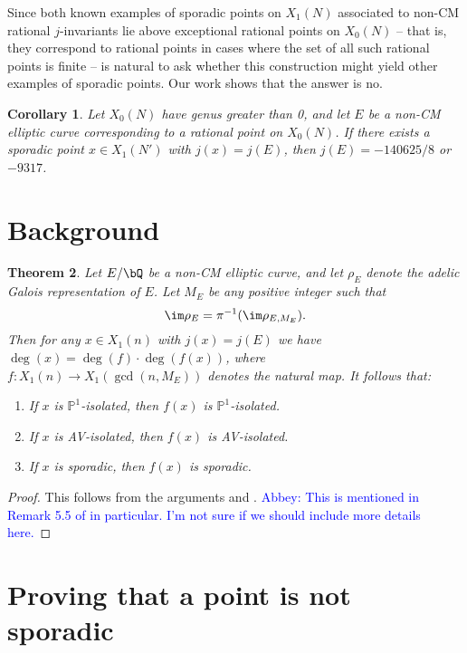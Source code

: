 \documentclass[11pt,reqno]{amsart}
\theoremstyle{plain}
\newtheorem{theorem}{Theorem}%
\newtheorem{corollary}[theorem]{Corollary}
\theoremstyle{definition}
\newcommand{\Q}{\bQ}
\newcommand{\abbey}[1]{\textcolor{blue}{Abbey: #1}}
\begin{document}
Since both known examples of sporadic points on $X_1(N)$ associated to non-CM rational $j$-invariants lie above exceptional rational points on $X_0(N)$ -- that is, they correspond to rational points in cases where the set of all such rational points is finite -- is natural to ask whether this construction might yield other examples of sporadic points. Our work shows that the answer is no.
\begin{corollary}
Let $X_0(N)$ have genus greater than 0, and let $E$ be a non-CM elliptic curve corresponding to a rational point on $X_0(N)$. If there exists a sporadic point $x \in X_1(N')$ with $j(x)=j(E)$, then $j(E) =-140625/8$ or $-9317$.
\end{corollary}

\section{Background}

\begin{theorem}
Let $E/\Q$ be a non-CM elliptic curve, and let $\rho_E$ denote the adelic Galois representation of $E$. Let $M_E$ be any positive integer such that 
\[
\im \rho_E=\pi^{-1}(\im \rho_{E, M_E}).
\]
Then for any $x \in X_1(n)$ with $j(x)=j(E)$ we have $\deg(x)=\deg(f)\cdot \deg(f(x))$, where $f: X_1(n) \rightarrow X_1(\gcd(n,M_E))$ denotes the natural map. It follows that:
\begin{enumerate}
\item If $x$ is $\mathbb{P}^1$-isolated, then $f(x)$ is $\mathbb{P}^1$-isolated.
\item If $x$ is AV-isolated, then $f(x)$ is AV-isolated.
\item If $x$ is sporadic, then $f(x)$ is sporadic.
\end{enumerate}
\end{theorem}

\begin{proof}
This follows from the arguments \cite[$\S5.3$]{BELOV} and \cite[Theorem 4.3]{BELOV}. \abbey{This is mentioned in Remark 5.5 of \cite{BELOV} in particular. I'm not sure if we should include more details here.}
\end{proof}

\section{Proving that a point is not sporadic}
\end{document}
